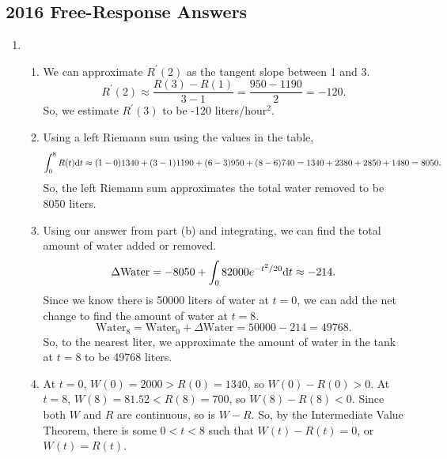 \subsection{2016 Free-Response Answers}

\begin{enumerate}
	\item \begin{enumerate}
		\item We can approximate $R^\prime(2)$ as the tangent slope between 1 and 3.
			\begin{equation*}
				R^\prime(2) \approx \frac{R(3)-R(1)}{3-1} = \frac{950-1190}{2} = -120.
			\end{equation*}
			So, we estimate $R^\prime(3)$ to be -120 liters/hour$^2$.
		\item Using a left Riemann sum using the values in the table,
			\begin{equation*}
				\int_{0}^{8}{R(t)\mathrm{d} t} \approx (1-0)1340 + (3-1)1190 + (6-3)950 + (8-6)740 = 1340 + 2380 + 2850 + 1480 = 8050.
			\end{equation*}
			So, the left Riemann sum approximates the total water removed to be 8050 liters.
		\item Using our answer from part (b) and integrating, we can find the total amount of water added or removed.
			\begin{equation*}
				\Delta \text{Water} = -8050 + \int_{0}{8}{2000e^{-t^2/20}\mathrm{d} t} \approx -214.
			\end{equation*}
			Since we know there is 50000 liters of water at $t=0$, we can add the net change to find the amount of water at $t=8$.
			\begin{equation*}
				\text{Water}_8 = \text{Water}_0 + \Delta \text{Water} = 50000 - 214 = 49768.
			\end{equation*}
			So, to the nearest liter, we approximate the amount of water in the tank at $t=8$ to be 49768 liters.
		\item At $t=0$, $W(0) = 2000 > R(0) = 1340$, so $W(0)-R(0) > 0$.
			At $t=8$, $W(8) = 81.52 < R(8) = 700$, so $W(8)-R(8) < 0$.
			Since both $W$ and $R$ are continuous, so is $W - R$.
			So, by the Intermediate Value Theorem, there is some $0 < t < 8$ such that $W(t)-R(t)=0$, or $W(t)=R(t)$.
	\end{enumerate}


\end{enumerate}
